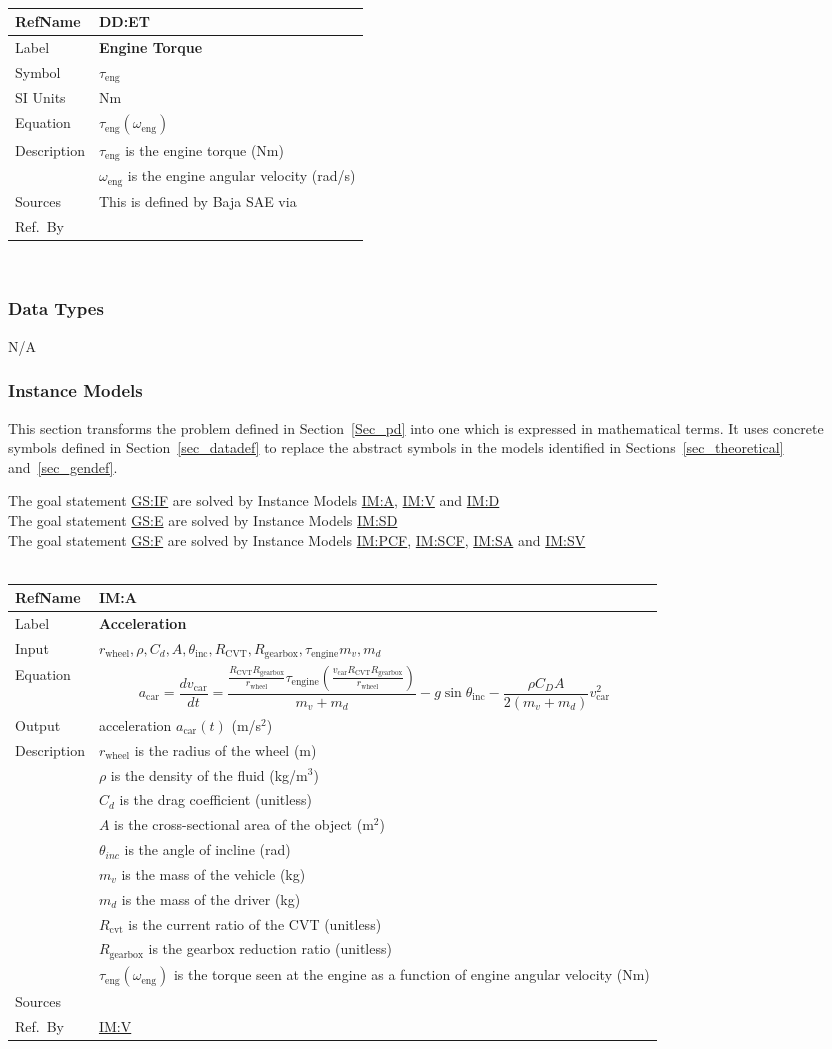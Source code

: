 \documentclass[12pt]{article}
\newcommand{\colAwidth}{0.13\textwidth}
\newcommand{\colBwidth}{0.82\textwidth}
\newcommand{\hpref}[1]{\hyperref[#1]{#1}}
\newcommand{\definstance}[8] {
~\newline
\noindent
\begin{minipage}{\textwidth}
\renewcommand*{\arraystretch}{1.5}
\begin{tabular}{| p{\colAwidth} | p{\colBwidth}|}
  \hline
  \rowcolor[gray]{0.9}
  RefName& \textbf{#1} \label{#1}\\
  \hline
  Label& \bf #2 \\
  \hline
  Input& #3\\
  \hline
  Equation& #4\\
  \hline
  Output& #5\\
  \hline
  Description& #6 \\
  \hline
  Sources& #7 \\
  \hline
  Ref.\ By & #8\\
  \hline
\end{tabular}
\end{minipage}\\
}
\newcommand{\defdata}[8] {
~\newline
\noindent
\begin{minipage}{\textwidth}
\renewcommand*{\arraystretch}{1.5}
\begin{tabular}{| p{\colAwidth} | p{\colBwidth}|}
\hline
\rowcolor[gray]{0.9}
RefName& \textbf{#1} \label{#1}\\
\hline
Label& \bf #2\\
\hline
Symbol & #3\\
\hline
SI Units & #4\\
\hline
Equation& #5\\
\hline
Description & #6\\
\hline
Sources& #7 \\
\hline
Ref.\ By & #8\\
\hline
\end{tabular}
\end{minipage}\\
}
\begin{document}
\defdata 
{DD:ET}
{Engine Torque}
{$\tau_\text{eng}$}
{Nm}
{$\tau_\text{eng}(\omega_\text{eng})$}
{
  $\tau_\text{eng}$ is the engine torque (Nm)\\
  & $\omega_\text{eng}$ is the engine angular velocity (rad/s)
}
{This is defined by Baja SAE via \citet{BajaSAEKohlerEngine2022}}%
{}%

\subsubsection{Data Types}\label{sec_datatypes}

N/A

\subsubsection{Instance Models} \label{sec_instance}    

This section transforms the problem defined in Section~\ref{Sec_pd} into 
one which is expressed in mathematical terms. It uses concrete symbols defined 
in Section~\ref{sec_datadef} to replace the abstract symbols in the models 
identified in Sections~\ref{sec_theoretical} and~\ref{sec_gendef}.
{\newline}

{\noindent}The goal statement \hpref{GS:IF} are solved by Instance Models \hpref{IM:A}, \hpref{IM:V} and \hpref{IM:D}\\
{\noindent}The goal statement \hpref{GS:E} are solved by Instance Models \hpref{IM:SD}\\
The goal statement \hpref{GS:F} are solved by Instance Models \hpref{IM:PCF}, \hpref{IM:SCF}, \hpref{IM:SA} and \hpref{IM:SV}\\
  \definstance
  {IM:A}
  {Acceleration}
  {$r_{\text{wheel}}, \rho, C_d, A, \theta_{\text{inc}}, R_{\text{CVT}}, R_\text{gearbox}, \tau_\text{engine} m_v, m_d$}
  {
    \[a_\text{car} = \frac{dv_\text{car}}{dt} = \frac{\frac{R_\text{CVT} R_\text{gearbox}}{r_\text{wheel}} \tau_\text{engine}(\frac{v_\text{car} R_\text{CVT} R_\text{gearbox}}{r_\text{wheel}})}{m_v + m_d} - g\sin{\theta_\text{inc}} - \frac{\rho C_D A}{2(m_v + m_d)} v_\text{car}^2 \]
  }
  {acceleration $a_\text{car}(t)$ (m/s$^2$)}
  {
  $r_{\text{wheel}}$ is the radius of the wheel (m)\\
  & $\rho$ is the density of the fluid (kg/m$^3$)\\
  & $C_d$ is the drag coefficient (unitless)\\
  & $A$ is the cross-sectional area of the object (m$^2$)\\
  & $\theta_{inc}$ is the angle of incline (rad)\\
  & $m_v$ is the mass of the vehicle (kg)\\
  & $m_d$ is the mass of the driver (kg)\\
  & $R_\text{cvt}$ is the current ratio of the CVT (unitless)\\
  & $R_\text{gearbox}$ is the gearbox reduction ratio (unitless)\\
  & $\tau_{\text{eng}}(\omega_\text{eng})$ is the torque seen at the engine as a function of engine angular velocity (Nm)
}
{}
{\hpref{IM:V}}
  
\end{document}
